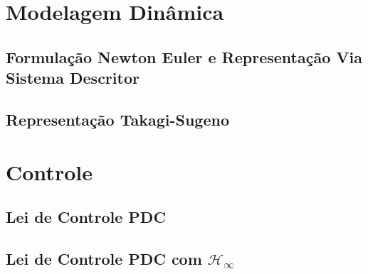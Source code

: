 \documentclass[a4paper,10pt]{article}
\begin{document}
%
%

\newcommand{\surname}{RAFFO}

\newcommand{\initials}{JMC}

\newcommand{\reportnumber}{1}

\newcommand{\reportversion}{1}

\newcommand{\reporttitle}{\textbf{Parallel Distributed Control(PDC) de um Pendulo Invertido Via Representação Takagi-Sugeno}}

\newcommand{\registrationnumber}{2016086496}

\newcommand{\studentname}{Jonatan Mota Campos}

\newcommand{\advisorname}{Guilherme Vianna Raffo}

\newcommand{\coadvisorname}{}



\newpage
\tableofcontents
\thispagestyle{empty}

\newpage
{}
\newcommand{\zero}{\bm{\emptyset}}

\section{Modelagem Dinâmica}
\subsection{Formulação Newton Euler e Representação Via Sistema Descritor}
\subsection{Representação Takagi-Sugeno}
\section{Controle}
\subsection{Lei de Controle PDC}
\subsection{Lei de Controle PDC com $\mathcal{H}_\infty$}
\end{document}
